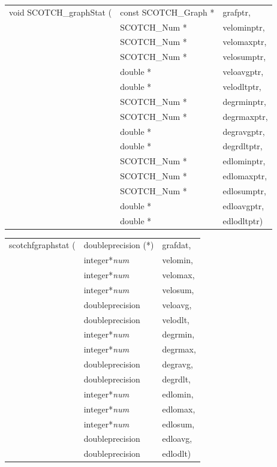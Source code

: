 \begin{itemize}
\progsyn

{\tt\begin{tabular}{l@{}ll}
void SCOTCH\_graphStat ( & const SCOTCH\_Graph * & grafptr, \\
                         & SCOTCH\_Num *         & velominptr, \\
                         & SCOTCH\_Num *         & velomaxptr, \\
                         & SCOTCH\_Num *         & velosumptr, \\
                         & double *              & veloavgptr, \\
                         & double *              & velodltptr, \\
                         & SCOTCH\_Num *         & degrminptr, \\
                         & SCOTCH\_Num *         & degrmaxptr, \\
                         & double *              & degravgptr, \\
                         & double *              & degrdltptr, \\
                         & SCOTCH\_Num *         & edlominptr, \\
                         & SCOTCH\_Num *         & edlomaxptr, \\
                         & SCOTCH\_Num *         & edlosumptr, \\
                         & double *              & edloavgptr, \\
                         & double *              & edlodltptr)
\end{tabular}}

{\tt\begin{tabular}{l@{}ll}
scotchfgraphstat ( & doubleprecision (*) & grafdat, \\
                   & integer*{\it num}   & velomin, \\
                   & integer*{\it num}   & velomax, \\
                   & integer*{\it num}   & velosum, \\
                   & doubleprecision     & veloavg, \\
                   & doubleprecision     & velodlt, \\
                   & integer*{\it num}   & degrmin, \\
                   & integer*{\it num}   & degrmax, \\
                   & doubleprecision     & degravg, \\
                   & doubleprecision     & degrdlt, \\
                   & integer*{\it num}   & edlomin, \\
                   & integer*{\it num}   & edlomax, \\
                   & integer*{\it num}   & edlosum, \\
                   & doubleprecision     & edloavg, \\
                   & doubleprecision     & edlodlt)
\end{tabular}}


\end{itemize}
